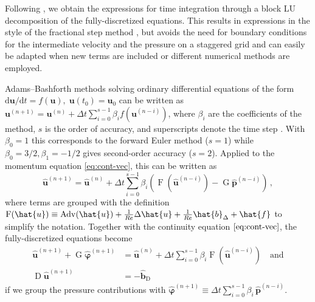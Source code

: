 \documentclass[gmd, manuscript]{copernicus}
\begin{document}
Following \citet{Perot1993}, we obtain the expressions for time integration through a block LU decomposition of the fully-discretized equations.
This results in expressions in the style of the fractional step method \citep{Chorin1968, Temam1969}, but avoids the need for boundary conditions for the intermediate velocity and the pressure on a staggered grid and can easily be adapted when new terms are included or different numerical methods are employed.

Adams--Bashforth methods solving ordinary differential equations of the form \(\mathrm{d}\boldsymbol{u} / \mathrm{d}t = f(\boldsymbol{u}),\; \boldsymbol{u}(t_0) = \boldsymbol{u}_0\) can be written as \(\boldsymbol{u}^{(n+1)} = \boldsymbol{u}^{(n)} + \Delta t \sum_{i=0}^{s-1} \beta_i f(\boldsymbol{u}^{(n-i)})\), where \(\beta_i\) are the coefficients of the method, \(s\) is the order of accuracy, and superscripts denote the time step \citep{HairerNorsettWanner1993}.
With \(\beta_0 = 1\) this corresponds to the forward Euler method (\(s=1\)) while \(\beta_0 = 3/2, \beta_1 = -1/2\) gives second-order accuracy (\(s=2\)).
Applied to the momentum equation \eqref{eq:cont-vec}, this can be written as
\begin{equation}
\boldsymbol{\hat{u}}^{(n+1)} = \boldsymbol{\hat{u}}^{(n)} + \Delta t \sum_{i=0}^{s-1} \beta_i \left( \operatorname{F}( \boldsymbol{\hat{u}}^{(n-i)} ) - \operatorname{G} \boldsymbol{\hat{p}}^{(n-i)} \right)\,,
\end{equation}
where terms are grouped with the definition \(\operatorname{F}(\boldsymbol{\hat{u}}) \equiv \operatorname{Adv}(\boldsymbol{\hat{u}}) + \frac{1}{R \mkern -.2mue} \Delta \boldsymbol{\hat{u}} + \frac{1}{R \mkern -.2mue} \boldsymbol{\hat{b}}_\Delta + \boldsymbol{\hat{f}}\) to simplify the notation.
Together with the continuity equation \(\eqref{eq:cont-vec}\), the fully-discretized equations become
\begin{equation}
  \begin{aligned}
  \boldsymbol{\hat{u}}^{(n+1)} + \operatorname{G} \boldsymbol{\hat{\varphi}}^{(n+1)} &=
  \boldsymbol{\hat{u}}^{(n)} + \Delta t \sum_{i=0}^{s-1} \beta_i
  \operatorname{F}\left( \boldsymbol{\hat{u}}^{(n-i)} \right)
  \quad\text{and} \\
  \operatorname{D} \boldsymbol{\hat{u}}^{(n+1)} &= - \boldsymbol{\hat{b}}_{\operatorname{D}}
  \end{aligned}
\end{equation}
if we group the pressure contributions with \(\boldsymbol{\hat{\varphi}}^{(n+1)} \equiv \Delta t \sum_{i=0}^{s-1} \beta_i\, \boldsymbol{\hat{p}}^{(n-i)}\).
\end{document}
